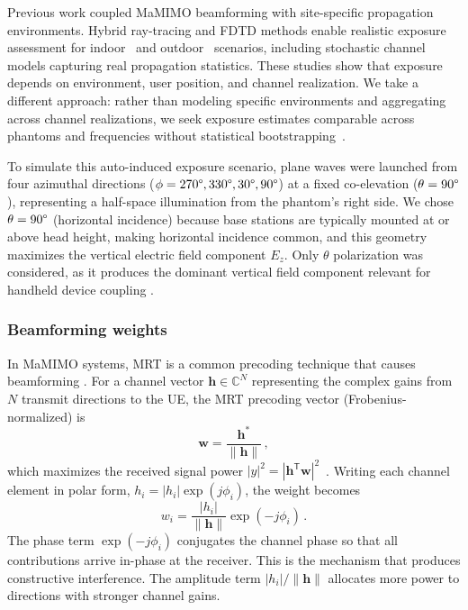 \documentclass{iopjournal}
\begin{document}
Previous work coupled \gls{MaMIMO} beamforming with site-specific propagation environments.
Hybrid ray-tracing and \gls{FDTD} methods enable realistic exposure assessment for indoor~\citep{shikhantsov2020massive,wydaeghe2022realistic} and outdoor~\citep{wydaeghe2025outdoor} scenarios, including stochastic channel models capturing real propagation statistics.
These studies show that exposure depends on environment, user position, and channel realization.
We take a different approach: rather than modeling specific environments and aggregating across channel realizations, we seek exposure estimates comparable across phantoms and frequencies without statistical bootstrapping~\citep{vermeeren2008sar,wydaeghe2022realistic}.

To simulate this auto-induced exposure scenario, plane waves were launched from four azimuthal directions ($\phi = 270\degree, 330\degree, 30\degree, 90\degree$) at a fixed co-elevation ($\theta = 90\degree$), representing a half-space illumination from the phantom's right side.
We chose $\theta = 90\degree$ (horizontal incidence) because base stations are typically mounted at or above head height, making horizontal incidence common, and this geometry maximizes the vertical electric field component $E_z$.
Only $\theta$ polarization was considered, as it produces the dominant vertical field component relevant for handheld device coupling \citep{shikhantsov2020massive}.

\subsubsection{Beamforming weights}
In \gls{MaMIMO} systems, \gls{MRT} is a common precoding technique that causes beamforming \citep{bjornson2017massive}.
For a channel vector $\mathbf{h} \in \mathbb{C}^N$ representing the complex gains from $N$ transmit directions to the \gls{UE}, the \gls{MRT} precoding vector (Frobenius-normalized) is
\begin{equation}
\mathbf{w} = \frac{\mathbf{h}^*}{\|\mathbf{h}\|} \,,
\label{eq:mrt_weights}
\end{equation}
which maximizes the received signal power $|y|^2 = |\mathbf{h}^\mathsf{T} \mathbf{w}|^2$~\citep{bjornson2017massive}.
Writing each channel element in polar form, $h_i = |h_i| \exp(j\phi_i)$, the weight becomes
\begin{equation}
w_i = \frac{|h_i|}{\|\mathbf{h}\|} \exp(-j\phi_i) \,.
\label{eq:mrt_polar}
\end{equation}
The phase term $\exp(-j\phi_i)$ conjugates the channel phase so that all contributions arrive in-phase at the receiver. This is the mechanism that produces constructive interference.
The amplitude term $|h_i|/\|\mathbf{h}\|$ allocates more power to directions with stronger channel gains.
\end{document}
